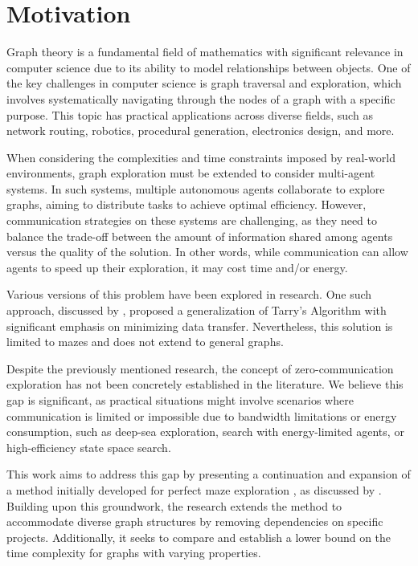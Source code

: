 \section{Motivation}
\label{section_intro_motivation}

Graph theory is a fundamental field of mathematics with significant relevance in
computer science due to its ability to model relationships between objects.
One of the key challenges in computer science is graph traversal and exploration, which involves systematically navigating through the nodes of a graph
with a specific purpose. This topic has practical applications across diverse fields, such as network routing, robotics, procedural generation, electronics design, and more.

When considering the complexities and time constraints imposed by real-world environments,
graph exploration must be extended to consider multi-agent systems. In such systems, multiple
autonomous agents collaborate to explore graphs, aiming to distribute tasks to achieve optimal efficiency. However, communication strategies
on these systems are challenging, as they need to balance the trade-off between the amount of information shared among agents
versus the quality of the solution. In other words, while communication can allow
agents to speed up their exploration, it may cost time and/or energy.

Various versions of this problem have been explored in research. 
One such approach, discussed by , proposed a generalization of Tarry's Algorithm with significant emphasis on minimizing data transfer.
Nevertheless, this solution is limited to mazes and does not extend to general graphs.

Despite the previously mentioned research, the concept of zero-communication exploration has not been
concretely established in the literature. We believe this gap is significant, as practical situations might involve
scenarios where communication is limited or impossible due to bandwidth limitations or energy consumption, such as deep-sea exploration,
search with energy-limited agents, or high-efficiency state space search. 

This work aims to address this gap by presenting a continuation and expansion of a method initially developed for perfect maze exploration \cite{Naeem2021}, as discussed by . Building upon this groundwork, the research extends the method to accommodate diverse graph structures by removing dependencies on specific projects. Additionally, it seeks to compare and establish a lower bound on the time complexity for graphs with varying properties.

